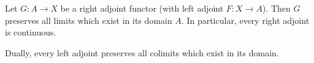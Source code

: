 Let $G : A \rightarrow X$ be a right adjoint functor (with left adjoint $F : X \rightarrow A$). Then $G$ preserves all limits which exist in its domain $A$. In particular, every right adjoint is continuous.

Dually, every left adjoint preserves all colimits which exist in its domain.

